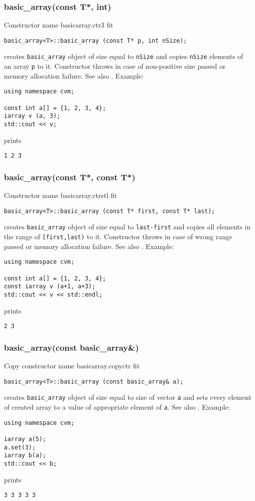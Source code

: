 \subsubsection{basic\_array(const T*, int)}
Constructor%
\pdfdest name {basicarray.ctr3} fit
\begin{verbatim}
basic_array<T>::basic_array (const T* p, int nSize);
\end{verbatim}
creates  \verb"basic_array" object of size equal to 
\verb"nSize" and copies \verb"nSize" elements of
an array \verb"p" to it.
Constructor throws  
in case of non-positive size passed or memory allocation failure.
See also .
Example:
\begin{Verbatim}
using namespace cvm;

const int a[] = {1, 2, 3, 4};
iarray v (a, 3);
std::cout << v;
\end{Verbatim}
prints
\begin{Verbatim}
1 2 3
\end{Verbatim}
\newpage


\subsubsection{basic\_array(const T*, const T*)}
Constructor%
\pdfdest name {basicarray.ctrstl} fit
\begin{verbatim}
basic_array<T>::basic_array (const T* first, const T* last);
\end{verbatim}
creates  \verb"basic_array" object of size equal to 
\verb"last-first" and copies all elements in the range
of \verb"[first,last)" to it.
Constructor throws 
in case of wrong range passed or memory allocation failure.
See also .
Example:
\begin{Verbatim}
using namespace cvm;

const int a[] = {1, 2, 3, 4};
const iarray v (a+1, a+3);
std::cout << v << std::endl;
\end{Verbatim}
prints
\begin{Verbatim}
2 3
\end{Verbatim}
\newpage


\subsubsection{basic\_array(const basic\_array\&)}
Copy constructor%
\pdfdest name {basicarray.copyctr} fit
\begin{verbatim}
basic_array<T>::basic_array (const basic_array& a);
\end{verbatim}
creates  \verb"basic_array" object of size equal to size of
vector \verb"a" and 
sets every element of created array to a value of
appropriate element of  \verb"a".
See also .
Example:
\begin{Verbatim}
using namespace cvm;

iarray a(5);
a.set(3);
iarray b(a);
std::cout << b;
\end{Verbatim}
prints
\begin{Verbatim}
3 3 3 3 3
\end{Verbatim}
\newpage


